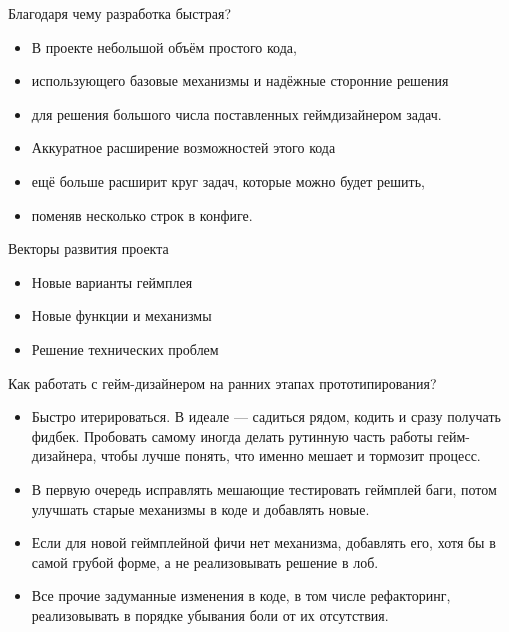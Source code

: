 \documentclass[aspectratio=169,handout,bigger]{beamer}
\begin{document}

\begin{frame}{Благодаря чему разработка быстрая?}
  \begin{itemize}
    \item В проекте небольшой объём простого кода,
    \item использующего базовые механизмы и надёжные сторонние решения
    \item для решения большого числа поставленных геймдизайнером задач.
  \end{itemize}

  \begin{itemize}
    \item Аккуратное расширение возможностей этого кода
    \item ещё больше расширит круг задач, которые можно будет решить,
    \item поменяв несколько строк в конфиге.
  \end{itemize}
\end{frame}


\begin{frame}{Векторы развития проекта}
  \begin{itemize}
    \item \Huge{Новые варианты геймплея}
    \item \large{Новые функции и механизмы}
    \item \normalsize{Решение технических проблем}
  \end{itemize}
\end{frame}


\begin{frame}{Как работать с гейм-дизайнером на ранних этапах прототипирования?}
  \begin{itemize}
    \item Быстро итерироваться.
          В идеале --- садиться рядом, кодить и сразу получать фидбек.
          Пробовать самому иногда делать рутинную часть работы гейм-дизайнера,
          чтобы лучше понять, что именно мешает и тормозит процесс.
    \item В первую очередь исправлять мешающие тестировать геймплей баги,
          потом улучшать старые механизмы в коде и добавлять новые.
    \item Если для новой геймплейной фичи нет механизма, добавлять его,
          хотя бы в самой грубой форме, а не реализовывать решение в лоб.
    \item Все прочие задуманные изменения в коде, в том числе рефакторинг,
          реализовывать в порядке убывания боли от их отсутствия.
  \end{itemize}
\end{frame}
\end{document}
